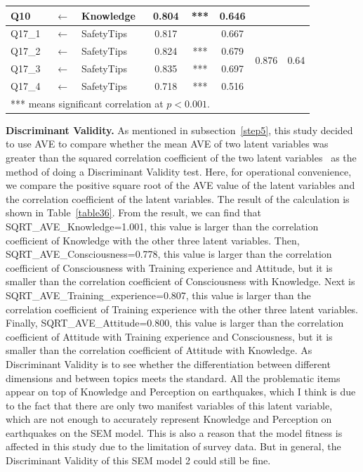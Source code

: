 \begin{table}[h]
\begin{tabular}{lcl|cc|ccc}
Q10                  & $\longleftarrow$       & Knowledge            & 0.804  & ***                  & 0.646                &                        &                        \\
\hline
Q17\_1               & $\longleftarrow$       & SafetyTips           & 0.817  &  & 0.667                & \multirow{4}{*}{0.876} & \multirow{4}{*}{0.64}  \\
Q17\_2               & $\longleftarrow$       & SafetyTips           & 0.824  & ***                  & 0.679                &                        &                        \\
Q17\_3               & $\longleftarrow$       & SafetyTips           & 0.835  & ***                  & 0.697                &                        &                        \\
Q17\_4               & $\longleftarrow$       & SafetyTips           & 0.718  & ***                  & 0.516                &                        &                       \\
  \hline
\multicolumn{5}{l}{*** means significant correlation at $p<0.001$.}
  \end{tabular}
\end{table}




\textbf{Discriminant Validity.} As mentioned in subsection~\ref{step5}, this study decided to use AVE to compare whether the mean AVE of two latent variables was greater than the squared correlation coefficient of the two latent variables~\cite{ref31} as the method of doing a Discriminant Validity test. Here, for operational convenience, we compare the positive square root of the AVE value of the latent variables and the correlation coefficient of the latent variables. The result of the calculation is shown in Table~\ref{table36}. From the result, we can find that SQRT\_AVE\_Knowledge=1.001, this value is larger than the correlation coefficient of Knowledge with the other three latent variables. Then, SQRT\_AVE\_Consciousness=0.778, this value is larger than the correlation coefficient of Consciousness with Training experience and Attitude, but it is smaller than the correlation coefficient of Consciousness with Knowledge. Next is SQRT\_AVE\_Training\_experience=0.807, this value is larger than the correlation coefficient of Training experience with the other three latent variables. Finally, SQRT\_AVE\_Attitude=0.800, this value is larger than the correlation coefficient of Attitude with Training experience and Consciousness, but it is smaller than the correlation coefficient of Attitude with Knowledge. As Discriminant Validity is to see whether the differentiation between different dimensions and between topics meets the standard. All the problematic items appear on top of Knowledge and Perception on earthquakes, which I think is due to the fact that there are only two manifest variables of this latent variable, which are not enough to accurately represent Knowledge and Perception on earthquakes on the SEM model. This is also a reason that the model fitness is affected in this study due to the limitation of survey data. But in general, the Discriminant Validity of this SEM model 2 could still be fine.


